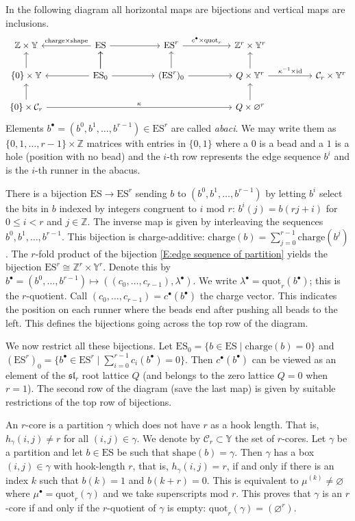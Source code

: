 \documentclass{amsart}
\newcommand{\Z}{\mathbb{Z}}
\newcommand{\Y}{\mathbb{Y}}
\newcommand{\cC}{\mathcal{C}}
\newcommand{\bd}{b^\bullet}
\newcommand{\cd}{c^\bullet}
\newcommand{\kb}{\kappa}
\newcommand{\lad}{{\lambda^\bullet}}
\newcommand{\mud}{{\mu^\bullet}}
\newcommand{\charge}{\mathrm{charge}}
\newcommand{\ES}{\mathrm{ES}}
\newcommand{\id}{\mathrm{id}}
\newcommand{\quot}{\mathrm{quot}}
\newcommand{\shape}{\mathrm{shape}}
\theoremstyle{remark}
\numberwithin{thm}{section}
\numberwithin{equation}{section}
\begin{document}
In the following diagram all horizontal maps are bijections and vertical maps are inclusions.
\[
\begin{tikzcd}[column sep=huge]
\Z\times \Y & \ES \arrow[l,swap,"\charge\times \shape"] \arrow[r] & \ES^r \arrow[r,"\cd\times \quot_r"] & \Z^r \times \Y^r \\
\{0\} \times \Y \arrow[u] & \ES_0 \arrow[u] \arrow[l]\arrow[u] \arrow[r] & (\ES^r)_0 \arrow[r] \arrow[u] & Q\times \Y^r \arrow[u] \arrow[r,"\kb^{-1}\times\id"] & \cC_r \times \Y^r \\ 
\{0\} \times \cC_r \arrow[u] \arrow[rrr,"\kb"] & & & Q \times \varnothing^r\arrow[u]
\end{tikzcd}
\]
Elements $b^\bullet=(b^0,b^1,\dotsc,b^{r-1})\in \ES^r$ are called \emph{abaci}. We may write them as $\{0,1,\dotsc,r-1\}\times \Z$ matrices with entries in $\{0,1\}$ where a $0$ is a bead and a $1$ is a hole (position with no bead) and the $i$-th row represents the edge sequence $b^i$ and is the $i$-th runner in the abacus.

There is a bijection $\ES\to \ES^r$ sending $b$ to $(b^0,b^1,\dotsc,b^{r-1})$ by letting $b^i$ select the bits in $b$ indexed by integers congruent to $i$ mod $r$: $b^i(j) = b(rj+i)$ for $0\le i<r$ and $j\in\Z$. The inverse map is given by interleaving the sequences $b^0,b^1,\dotsc,b^{r-1}$. 
This bijection is charge-additive: $\charge(b) = \sum_{j=0}^{r-1} \charge(b^j)$.
The $r$-fold product of the bijection \eqref{E:edge sequence of partition} yields the 
bijection $\ES^r \cong \Z^r \times \Y^r $. Denote this by $\bd=(b^0,\dotsc,b^{r-1})\mapsto ((c_0,\dotsc,c_{r-1}), \lad)$. We write $\lad = \quot_r(\bd)$; this is the $r$-quotient. Call $(c_0,\dotsc,c_{r-1})=\cd(\bd)$ the charge vector. This indicates the position on each runner where the beads end after pushing all beads to the left.
This defines the bijections going across the top row of the diagram.

We now restrict all these bijections. Let $\ES_0 = \{b\in \ES\mid \charge(b)=0\}$ and 
$(\ES^r)_0 = \{\bd\in\ES^r\mid \sum_{i=0}^{r-1} c_i(\bd) =0 \}$. 
Then $\cd(\bd)$ can be viewed as an element of the $\mathfrak{sl}_r$ root lattice $Q$ (and belongs to the zero lattice $Q=0$ when $r=1$).
The second row of the diagram (save the last map) 
is given by suitable restrictions of the top row of bijections.

An $r$-core is a partition $\gamma$ which does not have $r$ as a hook length.
That is, $h_\gamma(i,j)\ne r$ for all $(i,j)\in \gamma$. We denote by $\cC_r\subset \Y$ the set of $r$-cores.
Let $\gamma$ be a partition and let $b\in\ES$ be such that $\shape(b)=\gamma$.
Then $\gamma$ has a box $(i,j)\in\gamma$ with hook-length $r$, that is, $h_\gamma(i,j)=r$, 
if and only if there is an index $k$ such that $b(k)=1$ and $b(k+r)=0$. This is equivalent to $\mu^{(k)}\ne\varnothing$ where $\mud=\quot_r(\gamma)$ and we take superscripts mod $r$. This proves that $\gamma$ is an $r$-core if and only if the $r$-quotient of $\gamma$ is empty: $\quot_r(\gamma)=(\varnothing^r)$.
\end{document}
